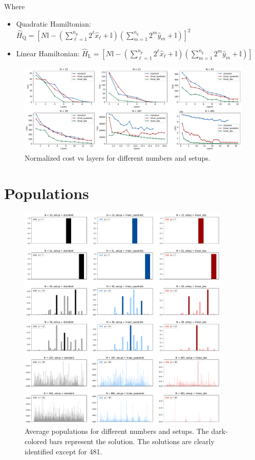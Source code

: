 \documentclass[12pt, letterpaper]{article}
\begin{document}
\noindent Where
\begin{itemize}
    \item Quadratic Hamiltonian: $\hat{H}_{\mathrm{Q}} = \left[ N\mathbb{I} - \left(\sum_{\ell=1}^{n_p} 2^{\ell} \hat{x}_{\ell} + \mathbb{I} \right)\left(\sum_{m=1}^{n_q} 2^{m} \hat{y}_{m} + \mathbb{I} \right)\right]^2$
    \item Linear Hamiltonian: $\hat{H}_{\mathrm{L}} = \left[ N\mathbb{I} - \left(\sum_{\ell=1}^{n_p} 2^{\ell} \hat{x}_{\ell} + \mathbb{I} \right)\left(\sum_{m=1}^{n_q} 2^{m} \hat{y}_{m} + \mathbb{I} \right)\right]$
\end{itemize}

\begin{figure}[h]
    \centering
    \includegraphics[width=1\textwidth]{setups_comparison.pdf}
    \caption{Normalized cost vs layers for different numbers and setups.}
\end{figure}


\pagebreak
\section{Populations}

\begin{figure}[h]
    \centering
    \includegraphics[width=0.9\textwidth]{analysis_populations.pdf}
    \caption{Average populations for different numbers and setups. The dark-colored bars represent the solution. The solutions are clearly identified except for 481.}
\end{figure}
\end{document}
